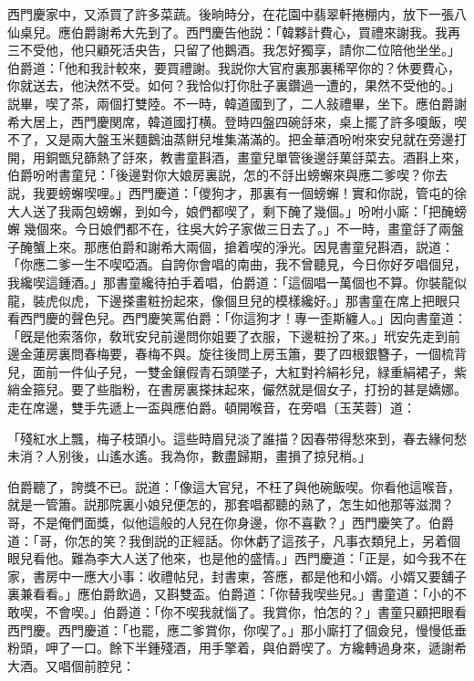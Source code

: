 西門慶家中，又添買了許多菜蔬。後晌時分，在花園中翡翠軒捲棚内，放下一張八仙桌兒。應伯爵謝希大先到了。西門慶告他説：「韓夥計費心，買禮來謝我。我再三不受他，他只顧死活央告，只留了他鵝酒。我怎好獨享，請你二位陪他坐坐。」伯爵道：「他和我計較來，要買禮謝。我説你大官府裏那裏稀罕你的？休要費心，你就送去，他決然不受。如何？我恰似打你肚子裏鑽過一遭的，果然不受他的。」説畢，喫了茶，兩個打雙陸。不一時，韓道國到了，二人敍禮畢，坐下。應伯爵謝希大居上，西門慶関席，韓道國打横。登時四盤四碗㧱來，桌上擺了許多嗄飯，喫不了，又是兩大盤玉米麵鵝油蒸餅兒堆集滿滿的。把金華酒吩咐來安兒就在旁邊打開，用銅甑兒篩熱了㧱來，教書童斟酒，畫童兒單管後邊㧱菓㧱菜去。酒斟上來，伯爵吩咐書童兒：「後邊對你大娘房裏説，怎的不㧱出螃蠏來與應二爹喫？你去説，我要螃蠏喫哩。」西門慶道：「儍狗才，那裏有一個螃蠏！實和你説，管屯的徐大人送了我兩包螃蠏，到如今，娘們都喫了，剩下醃了幾個。」吩咐小廝：「把醃螃蠏𢵞幾個來。今日娘們都不在，往吳大妗子家做三日去了。」不一時，畫童㧱了兩盤子醃蟹上來。那應伯爵和謝希大兩個，搶着喫的淨光。因見書童兒斟酒，説道：「你應二爹一生不喫啞酒。自誇你會唱的南曲，我不曾聽見，今日你好歹唱個兒，我纔喫這鍾酒。」那書童纔待拍手着唱，伯爵道：「這個唱一萬個也不算。你裝龍似龍，裝虎似虎，下邊搽畫粧扮起來，像個旦兒的模樣纔好。」那書童在席上把眼只看西門慶的聲色兒。西門慶笑罵伯爵：「你這狗才！專一歪斯纏人。」因向書童道：「旣是他索落你，敎玳安兒前邊問你姐要了衣服，下邊粧扮了來。」玳安先走到前邊金蓮房裏問春梅要，春梅不與。旋往後問上房玉簫，要了四根銀簪子，一個梳背兒，面前一件仙子兒，一雙金鑲假青石頭墜子，大紅對衿絹衫兒，緑重絹裙子，紫綃金箍兒。要了些脂粉，在書房裏搽抹起來，儼然就是個女子，打扮的甚是嬌娜。走在席邊，雙手先遞上一盃與應伯爵。頓開喉音，在旁唱〔玉芙蓉〕道：

\begin{myquote}
「殘紅水上飄，梅子枝頭小。這些時眉兒淡了誰描？因春带得愁來到，春去緣何愁未消？人别後，山遙水遙。我為你，數盡歸期，畫損了掠兒梢。」
\end{myquote}

伯爵聽了，誇獎不已。説道：「像這大官兒，不枉了與他碗飯喫。你看他這喉音，就是一管簫。説那院裏小娘兒便怎的，那套唱都聽的熟了，怎生如他那等滋潤？哥，不是俺們面獎，似他這般的人兒在你身邊，你不喜歡？」西門慶笑了。伯爵道：「哥，你怎的笑？我倒説的正經話。你休虧了這孩子，凡事衣類兒上，另着個眼兒看他。難為李大人送了他來，也是他的盛情。」西門慶道：「正是，如今我不在家，書房中一應大小事：收禮帖兒，封書柬，答應，都是他和小婿。小婿又要舖子裏兼看看。」應伯爵飲過，又斟雙盃。伯爵道：「你替我喫些兒。」書童道：「小的不敢喫，不會喫。」伯爵道：「你不喫我就惱了。我賞你，怕怎的？」書童只顧把眼看西門慶。西門慶道：「也罷，應二爹賞你，你喫了。」那小廝打了個僉兒，慢慢低垂粉頭，呷了一口。餘下半鍾殘酒，用手擎着，與伯爵喫了。方纔轉過身來，遞謝希大酒。又唱個前腔兒：

